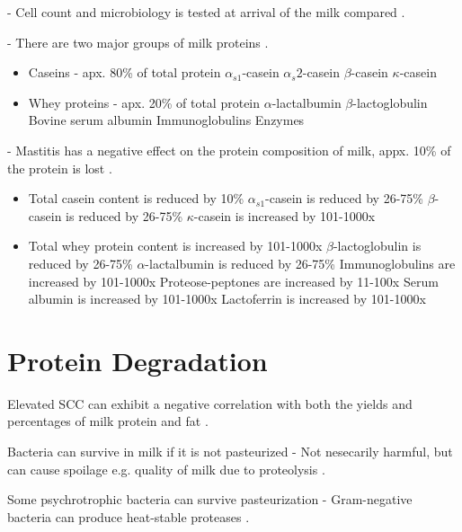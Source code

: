 - Cell count and microbiology is tested at arrival of the milk compared \cite*{s04_protein_fraction_in_milk}.


- There are two major groups of milk proteins \cite*{s04_protein_fraction_in_milk}.
\begin{itemize}
    \item Caseins       - apx. 80\% of total protein
        \subitem $\alpha_{s1}$-casein
        \subitem $\alpha_s2$-casein
        \subitem $\beta$-casein
        \subitem $\kappa$-casein

    \item Whey proteins - apx. 20\% of total protein
        \subitem $\alpha$-lactalbumin
        \subitem $\beta$-lactoglobulin
        \subitem Bovine serum albumin
        \subitem Immunoglobulins
        \subitem Enzymes
\end{itemize}

- Mastitis has a negative effect on the protein composition of milk, appx. 10\% of the protein is lost \cite*{s05_mastitis_complex}.
\begin{itemize}
    \item Total casein content is reduced by 10\%
        \subitem $\alpha_{s1}$-casein is reduced by 26-75\%
        \subitem $\beta$-casein is reduced by 26-75\%
        \subitem $\kappa$-casein is increased by 101-1000x

    \item Total whey protein content is increased by 101-1000x
    \subitem $\beta$-lactoglobulin is reduced by 26-75\%
    \subitem $\alpha$-lactalbumin is reduced by 26-75\%
    \subitem Immunoglobulins are increased by 101-1000x
    \subitem Proteose-peptones are increased by 11-100x
    \subitem Serum albumin is increased by 101-1000x
    \subitem Lactoferrin is increased by 101-1000x
\end{itemize}


\section{Protein Degradation}
Elevated SCC can exhibit a negative correlation with both the yields and percentages of milk protein and fat \cite*{a06_organic_milk_production}.

Bacteria can survive in milk if it is not pasteurized
    - Not nesecarily harmful, but can cause spoilage e.g. quality of milk due to proteolysis \cite*{s01_heat_treatment_1}.

Some psychrotrophic bacteria can survive pasteurization
    - Gram-negative bacteria can produce heat-stable proteases \cite*{s01_heat_treatment_1}.

